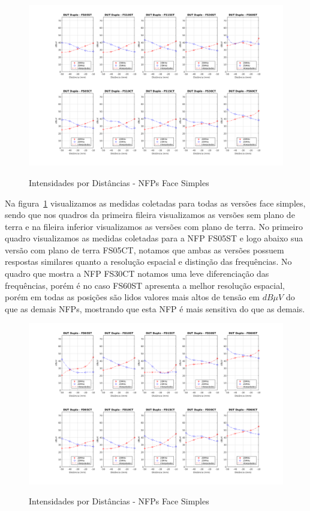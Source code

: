 \begin{figure}[htb!]
	\centering 
	\caption{Intensidades por Distâncias - NFPs Face Simples}
	\includegraphics[scale=0.45]{./img/DUTDuplo_FS}
	\label{fig:DUTDuplo_FS}
\end{figure}

Na figura~\ref{fig:DUTDuplo_FS} visualizamos as medidas coletadas para todas as versões face simples, sendo que nos quadros da primeira fileira visualizamos as versões sem plano de terra e na fileira inferior visualizamos as versões com plano de terra. No primeiro quadro visualizamos as medidas coletadas para a NFP FS05ST e logo abaixo sua versão com plano de terra FS05CT, notamos que ambas as versões possuem respostas similares quanto a resolução espacial e distinção das frequências. No quadro que mostra a NFP FS30CT notamos uma leve diferenciação das frequências, porém é no caso FS60ST apresenta a melhor resolução espacial, porém em todas as posições são lidos valores mais altos de tensão em $dB \mu V$ do que as demais NFPs, mostrando que esta NFP é mais sensitiva do que as demais.

\begin{figure}[htb!]
	\centering 
	\caption{Intensidades por Distâncias - NFPs Face Simples}
	\includegraphics[scale=0.45]{./img/DUTDuplo_FD}
	\label{fig:DUTDuplo_FD}
\end{figure}

